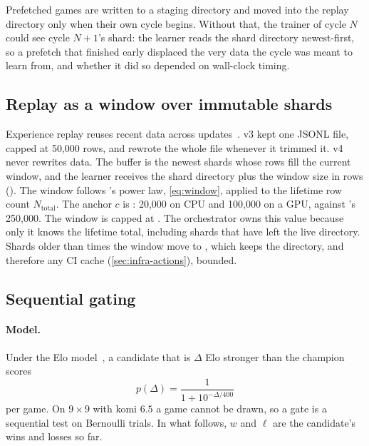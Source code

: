 Prefetched games are written to a staging directory and moved into the replay
directory only when their own cycle begins. Without that, the trainer of cycle $N$ could
see cycle $N{+}1$'s shard: the learner reads the shard directory newest-first, so a
prefetch that finished early displaced the very data the cycle was meant to learn from,
and whether it did so depended on wall-clock timing.

\subsection{Replay as a window over immutable shards}
\label{sec:orch-replay}

Experience replay reuses recent data across updates~\citep{lin1992self,mnih2015human}.
v3 kept one JSONL file, capped at 50{,}000 rows, and rewrote the whole file whenever it
trimmed it. v4 never rewrites data. The buffer is the newest shards whose rows fill the
current window, and the learner receives the shard directory plus the window size in rows
(). The window follows \katago{}'s power law, \cref{eq:window}, applied
to the lifetime row count $N_{\mathrm{total}}$. The anchor $c$ is :
20{,}000 on CPU and 100{,}000 on a GPU, against \katago{}'s 250{,}000. The window is capped at
. The orchestrator owns this value because only it knows the lifetime
total, including shards that have left the live directory. Shards older than
 times the window move to , which keeps the
directory, and therefore any CI cache (\cref{sec:infra-actions}), bounded.

\subsection{Sequential gating}
\label{sec:orch-gate}

\paragraph{Model.}
Under the Elo model~\citep{elo1978rating}, a candidate that is $\Delta$ Elo stronger than
the champion scores
\begin{equation}
  p(\Delta) = \frac{1}{1 + 10^{-\Delta/400}}
  \label{eq:elo-score}
\end{equation}
per game. On $9\times9$ with komi $6.5$ a game cannot be drawn, so a gate is a sequential
test on Bernoulli trials. In what follows, $w$ and $\ell$ are the candidate's wins and losses
so far.


